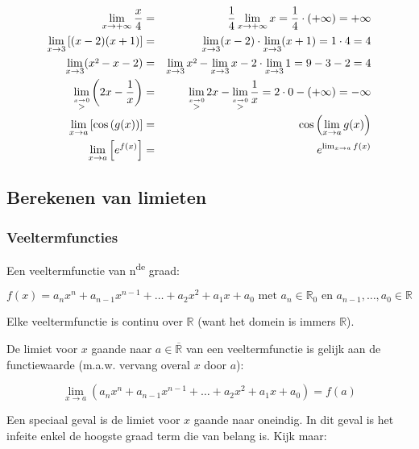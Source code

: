 \begin{voorbeeld}
\begin{eqnarray*}
\lim_{x\to+\infty}\frac{x}{4}&=&\frac{1}{4} \lim_{x\to+\infty}x=\frac{1}{4}\cdot (+\infty)=+\infty\\
\lim_{x\to3}\left[(x-2)(x+1)\right]&=& \lim_{x\to3}(x-2)\cdot  \lim_{x\to3}(x+1)=1\cdot 4=4\\
\lim_{x\to3}(x\text{\texttwosuperior}-x-2)&=& \lim_{x\to3}x\text{\texttwosuperior}- \lim_{x\to3}x-2\cdot  \lim_{x\to3}1=9-3-2=4\\
\lim_{\overset{x\rightarrow0}{>}}\left(2x-\frac{1}{x}\right)&=& \lim_{\overset{x\rightarrow0}{>}}2x- \lim_{\overset{x\rightarrow0}{>}}\frac{1}{x}=2\cdot 0-\left(+\infty\right)=-\infty\\
\lim_{x\to a}\left[\cos\left(g(x)\right)\right]&=&\cos\left( \lim_{x\to a}g(x)\right)\\
\lim_{x\to a}\left[e^{f(x)}\right]&=&e^{\lim_{x\to a}f(x)}
\end{eqnarray*}
\end{voorbeeld}

\subsection{Berekenen van limieten}

\subsubsection{Veeltermfuncties}

Een veeltermfunctie van n\textsuperscript{de} graad:

\begin{equation*}
f(x)=a_{n}x^{n}+a_{n-1}x^{n-1}+\ldots+a_{2}x^{2}+a_{1}x+a_{0}\text{ met }
a_{n}\in\mathbb{R}_{0}\text{ en }a_{n-1},\ldots,a_{0}\in\mathbb{R}
\end{equation*}

Elke veeltermfunctie is continu over $\mathbb{R}$ (want
het domein is immers $\mathbb{R}$).

De limiet voor $x$ gaande naar $a\in\overline{\mathbb{R}}$
van een veeltermfunctie is gelijk aan de functiewaarde (m.a.w. vervang
overal $x$ door $a$):

\begin{equation*}
\lim_{x\to a}\left(a_{n}x^{n}+a_{n-1}x^{n-1}+\ldots+a_{2}x^{2}+a_{1}x+a_{0}\right)=f(a)
\end{equation*}

Een speciaal geval is de limiet voor $x$ gaande naar oneindig.
In dit geval is het infeite enkel de hoogste graad term die van belang
is. Kijk maar:


